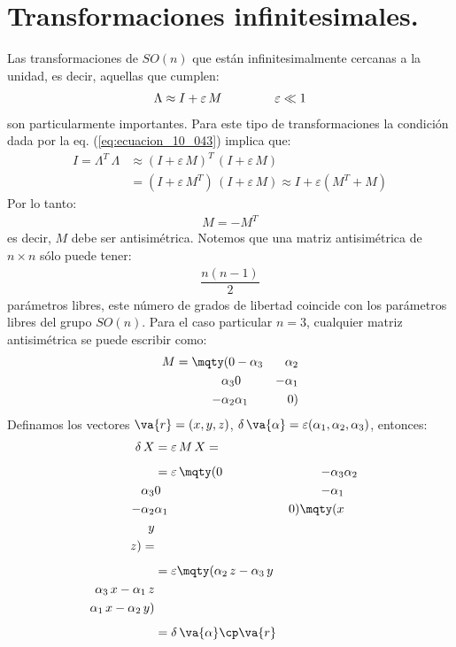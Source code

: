 \section{Transformaciones infinitesimales.}

Las transformaciones de $SO(n)$ que están infinitesimalmente cercanas a la unidad, es decir, aquellas que cumplen:
\begin{align}
\Lambda \approx I + \varepsilon \, M \hspace{1.5cm} \varepsilon \ll 1
\label{eq:ecuacion_10_062}
\end{align}
son particularmente importantes. Para este tipo de transformaciones la condición dada por la eq. (\ref{eq:ecuacion_10_043}) implica que:
\begin{align}
I = \Lambda^{T} \, \Lambda &\approx (I + \varepsilon \, M)^{T} \, (I + \varepsilon \, M) \label{eq:ecuacion_10_063} \\[0.5em]
&= (I + \varepsilon \, M^{T}) \, (I + \varepsilon \, M)  \approx I + \varepsilon (M^{T} + M) \label{eq:ecuacion_10_064}
\end{align}
Por lo tanto:
\begin{align}
M = - M^{T}
\label{eq:ecuacion_10_065}
\end{align}
es decir, $M$ debe ser antisimétrica. Notemos que una matriz antisimétrica de $n \times n$ sólo puede tener:
\begin{align*}
\dfrac{n(n-1)}{2}
\end{align*}
parámetros libres, este número de grados de libertad coincide con los parámetros libres del grupo $SO(n)$. Para el caso particular $n = 3$, cualquier matriz antisimétrica se puede escribir como:
\begin{align}
M = \mqty(0 & -\alpha_{3} & \alpha_{2} \\ \alpha_{3} & 0 & -\alpha_{1} \\ -\alpha_{2} & \alpha_{1} & 0)
\label{eq:ecuacion_10_066}
\end{align}
Definamos los vectores $\va{r} = (x, y ,z)$, $\delta \, \va{\alpha} = \varepsilon (\alpha_{1}, \alpha_{2}, \alpha_{3})$, entonces:
\begin{align}
\begin{aligned}[b]
\delta \, X &= \varepsilon \, M \, X = \\[0.5em]
&= \varepsilon \, \mqty(0 & -\alpha_{3} & \alpha_{2} \\ \alpha_{3} & 0 & -\alpha_{1} \\ -\alpha_{2} & \alpha_{1} & 0) \mqty(x \\ y \\ z) = \\[0.5em]
&= \varepsilon \mqty(\alpha_{2} \, z - \alpha_{3} \, y \\ \alpha_{3} \, x - \alpha_{1} \, z \\ \alpha_{1} \, x - \alpha_{2} \, y) \\[0.5em]
&= \delta \, \va{\alpha} \cp \va{r}
\end{aligned}
\label{eq:ecuacion_10_067}
\end{align}
